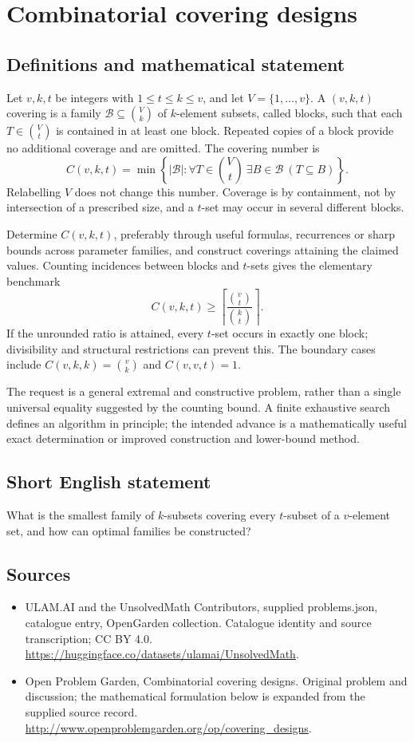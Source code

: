 \documentclass[11pt,a4paper]{article}
\begin{document}
\section*{Combinatorial covering designs}\label{statement}

\subsection{Definitions and mathematical statement}
Let $v,k,t$ be integers with $1\le t\le k\le v$, and let
$V=\{1,\ldots,v\}$. A $(v,k,t)$ covering is a family
$\mathcal B\subseteq\binom Vk$ of $k$-element subsets, called blocks,
such that each $T\in\binom Vt$ is contained in at least one block.
Repeated copies of a block provide no additional coverage and are omitted.
The covering number is
\[
 C(v,k,t)=\min\left\{|\mathcal B|:
 \forall T\in\binom Vt\ \exists B\in\mathcal B\ (T\subseteq B)\right\}.
\]
Relabelling $V$ does not change this number. Coverage is by containment,
not by intersection of a prescribed size, and a $t$-set may occur in
several different blocks.

Determine $C(v,k,t)$, preferably through useful formulas, recurrences or
sharp bounds across parameter families, and construct coverings attaining
the claimed values. Counting incidences between blocks and $t$-sets gives
the elementary benchmark
\[
 C(v,k,t)\ge
 \left\lceil\frac{\binom vt}{\binom kt}\right\rceil.
\]
If the unrounded ratio is attained, every $t$-set occurs in exactly one
block; divisibility and structural restrictions can prevent this.
The boundary cases include $C(v,k,k)=\binom vk$ and $C(v,v,t)=1$.

The request is a general extremal and constructive problem, rather than
a single universal equality suggested by the counting bound. A finite
exhaustive search defines an algorithm in principle; the intended advance
is a mathematically useful exact determination or improved construction
and lower-bound method.
\subsection{Short English statement}
What is the smallest family of $k$-subsets covering every $t$-subset of a $v$-element set, and how can optimal families be constructed?
\subsection{Sources}
\begin{itemize}
\item[S1] ULAM.AI and the UnsolvedMath Contributors, supplied problems.json, catalogue entry, OpenGarden collection. Catalogue identity and source transcription; CC BY 4.0.
\url{https://huggingface.co/datasets/ulamai/UnsolvedMath}.
\item[S2] Open Problem Garden, Combinatorial covering designs. Original problem and discussion; the mathematical formulation below is expanded from the supplied source record.
\url{http://www.openproblemgarden.org/op/covering_designs}.
\end{itemize}
\end{document}
